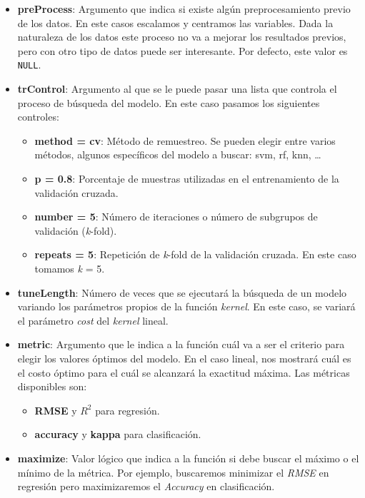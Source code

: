 \documentclass[12pt,spanish,a4paper]{article}
\numberwithin{equation}{section}
\begin{document}
\begin{itemize}
\item
  \textbf{preProcess}: Argumento que indica si existe algún
  preprocesamiento previo de los datos. En este casos escalamos y
  centramos las variables. Dada la naturaleza de los datos este proceso
  no va a mejorar los resultados previos, pero con otro tipo de datos
  puede ser interesante. Por defecto, este valor es \texttt{NULL}.
\item
  \textbf{trControl}: Argumento al que se le puede pasar una lista que
  controla el proceso de búsqueda del modelo. En este caso pasamos los
  siguientes controles:

  \begin{itemize}
  \item
    \textbf{method = cv}: Método de remuestreo. Se pueden elegir entre
    varios métodos, algunos específicos del modelo a buscar: svm, rf,
    knn, \ldots{}
  \item
    \textbf{p = 0.8}: Porcentaje de muestras utilizadas en el
    entrenamiento de la validación cruzada.
  \item
    \textbf{number = 5}: Número de iteraciones o número de subgrupos de
    validación (\emph{k}-fold).
  \item
    \textbf{repeats = 5}: Repetición de \emph{k}-fold de la validación
    cruzada. En este caso tomamos \emph{k} = 5.
  \end{itemize}
\item
  \textbf{tuneLength}: Número de veces que se ejecutará la búsqueda de
  un modelo variando los parámetros propios de la función \emph{kernel}.
  En este caso, se variará el parámetro \emph{cost} del \emph{kernel}
  lineal.
\item
  \textbf{metric}: Argumento que le indica a la función cuál va a ser el
  criterio para elegir los valores óptimos del modelo. En el caso
  lineal, nos mostrará cuál es el costo óptimo para el cuál se alcanzará
  la exactitud máxima. Las métricas disponibles son:

  \begin{itemize}
  \item
    \textbf{RMSE} y \(R^2\) para regresión.
  \item
    \textbf{accuracy} y \textbf{kappa} para clasificación.
  \end{itemize}
\item
  \textbf{maximize}: Valor lógico que indica a la función si debe buscar
  el máximo o el mínimo de la métrica. Por ejemplo, buscaremos minimizar
  el \emph{RMSE} en regresión pero maximizaremos el \emph{Accuracy} en
  clasificación.
\end{itemize}
\end{document}
